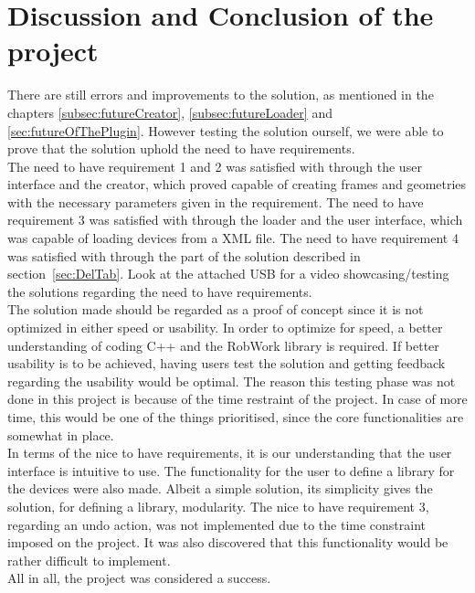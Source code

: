 \section{Discussion and Conclusion of the project}
There are still errors and improvements to the solution, as mentioned in the chapters \ref{subsec:futureCreator}, \ref{subsec:futureLoader} and \ref{sec:futureOfThePlugin}. However testing the solution ourself, we were able to prove that the solution uphold the need to have requirements.\\

The need to have requirement 1 and 2 was satisfied with through the user interface and the creator, which proved capable of creating frames and geometries with the necessary parameters given in the requirement.
The need to have requirement 3 was satisfied with through the loader and the user interface, which was capable of loading devices from a XML file.
The need to have requirement 4 was satisfied with through the part of the solution described in section~\ref{sec:DelTab}. Look at the attached USB for a video showcasing/testing the solutions regarding the need to have requirements.\\

The solution made should be regarded as a proof of concept since it is not optimized in either speed or usability. In order to optimize for speed, a better understanding of coding C++ and the RobWork library is required. If better usability is to be achieved, having users test the solution and getting feedback regarding the usability would be optimal. The reason this testing phase was not done in this project is because of the time restraint of the project. In case of more time, this would be one of the things prioritised, since the core functionalities are somewhat in place.\\

In terms of the nice to have requirements, it is our understanding that the user interface is intuitive to use. The functionality for the user to define a library for the devices were also made. Albeit a simple solution, its simplicity gives the solution, for defining a library, modularity. The nice to have requirement 3, regarding an undo action, was not implemented due to the time constraint imposed on the project. It was also discovered that this functionality would be rather difficult to implement.\\

All in all, the project was considered a success.